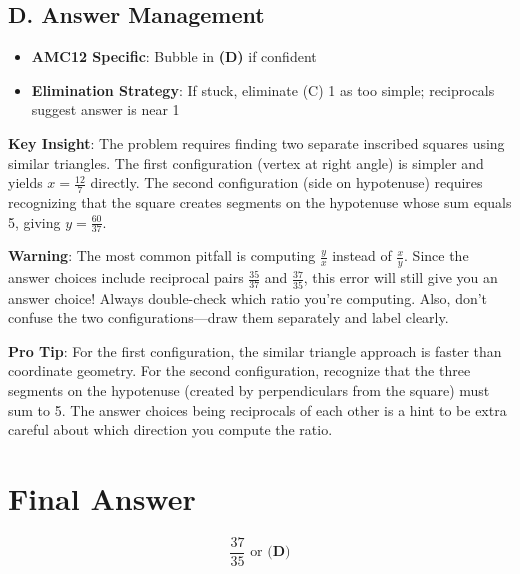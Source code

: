 \documentclass[]{article}
\begin{document}
\begin{competitionbox}
\subsection*{D. Answer Management}
\begin{itemize}[leftmargin=*]
    \item \textbf{AMC12 Specific}: Bubble in \textbf{(D)} if confident
    \item \textbf{Elimination Strategy}: If stuck, eliminate (C) 1 as too simple; reciprocals suggest answer is near 1
\end{itemize}
\end{competitionbox}

\begin{keyinsightbox}
\textbf{Key Insight}: The problem requires finding two separate inscribed squares using similar triangles. The first configuration (vertex at right angle) is simpler and yields $x = \frac{12}{7}$ directly. The second configuration (side on hypotenuse) requires recognizing that the square creates segments on the hypotenuse whose sum equals 5, giving $y = \frac{60}{37}$.
\end{keyinsightbox}

\begin{warningbox}
\textbf{Warning}: The most common pitfall is computing $\frac{y}{x}$ instead of $\frac{x}{y}$. Since the answer choices include reciprocal pairs $\frac{35}{37}$ and $\frac{37}{35}$, this error will still give you an answer choice! Always double-check which ratio you're computing. Also, don't confuse the two configurations—draw them separately and label clearly.
\end{warningbox}

\begin{tipbox}
\textbf{Pro Tip}: For the first configuration, the similar triangle approach is faster than coordinate geometry. For the second configuration, recognize that the three segments on the hypotenuse (created by perpendiculars from the square) must sum to 5. The answer choices being reciprocals of each other is a hint to be extra careful about which direction you compute the ratio.
\end{tipbox}

\section*{Final Answer}
\[\boxed{\frac{37}{35} \text{ or } \textbf{(D)}}\]
\end{document}
